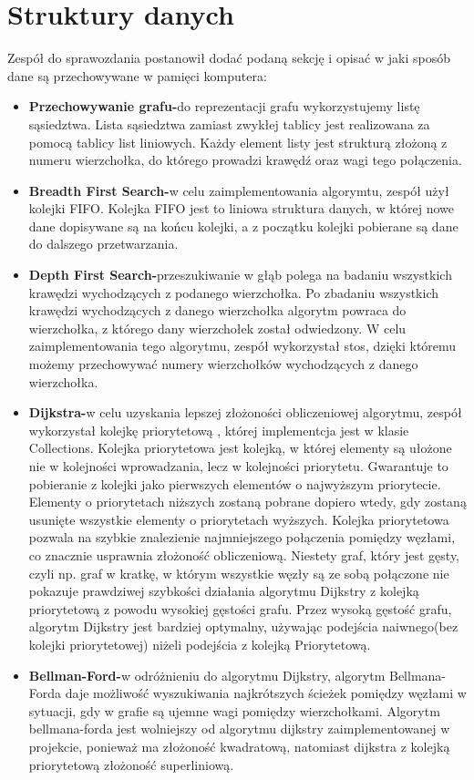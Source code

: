 \documentclass[10pt]{article}
\begin{document}
\section{Struktury danych}
Zespół do sprawozdania postanowił dodać podaną sekcję i opisać w jaki sposób dane są przechowywane w pamięci komputera:
\begin{itemize}
    \item \textbf{Przechowywanie grafu-}do reprezentacji grafu wykorzystujemy listę sąsiedztwa. Lista sąsiedztwa zamiast zwykłej tablicy jest realizowana za pomocą tablicy list liniowych. Każdy element listy jest strukturą złożoną z numeru wierzchołka, do którego prowadzi krawędź oraz wagi tego połączenia.
    \item \textbf{Breadth First Search-}w celu zaimplementowania algorymtu, zespół użył kolejki FIFO. Kolejka FIFO jest to liniowa struktura danych, w której nowe dane dopisywane są na końcu kolejki, a z początku kolejki pobierane są dane do dalszego przetwarzania.
    \item \textbf{Depth First Search-}przeszukiwanie w głąb polega na badaniu wszystkich krawędzi wychodzących z podanego wierzchołka. Po zbadaniu wszystkich krawędzi wychodzących z danego wierzchołka algorytm powraca do wierzchołka, z którego dany wierzchołek został odwiedzony. W celu zaimplementowania tego algorytmu, zespół wykorzystał stos, dzięki któremu możemy przechowywać numery wierzchołków wychodzących z danego wierzchołka.
    \item \textbf{Dijkstra-}w celu uzyskania lepszej złożoności obliczeniowej algorytmu, zespół wykorzystał kolejkę priorytetową , której implementcja jest w klasie Collections. Kolejka priorytetowa jest kolejką, w której elementy są ułożone nie w kolejności wprowadzania, lecz w kolejności priorytetu. Gwarantuje to pobieranie z kolejki jako pierwszych elementów o najwyższym priorytecie. Elementy o priorytetach niższych zostaną pobrane dopiero wtedy, gdy zostaną usunięte wszystkie elementy o priorytetach wyższych. Kolejka priorytetowa pozwala na szybkie znalezienie najmniejszego połączenia pomiędzy węzłami, co znacznie usprawnia złożoność obliczeniową. Niestety graf, który jest gęsty, czyli np. graf w kratkę, w którym wszystkie węzły są ze sobą połączone nie pokazuje prawdziwej szybkości działania algorytmu Dijkstry z kolejką priorytetową z powodu wysokiej gęstości grafu. Przez wysoką gęstość grafu, algorytm Dijkstry jest bardziej optymalny, używając podejścia naiwnego(bez kolejki priorytetowej) niżeli podejścia z kolejką Priorytetową.
    \newpage
    \item \textbf{Bellman-Ford-}w odróżnieniu do algorytmu Dijkstry, algorytm Bellmana-Forda daje możliwość wyszukiwania najkrótszych ścieżek pomiędzy węzłami w sytuacji, gdy w grafie są ujemne wagi pomiędzy wierzchołkami. Algorytm bellmana-forda jest wolniejszy od algorytmu dijkstry zaimplementowanej w projekcie, ponieważ ma złożoność kwadratową, natomiast dijkstra z kolejką priorytetową złożoność superliniową.

\end{itemize}
\end{document}
